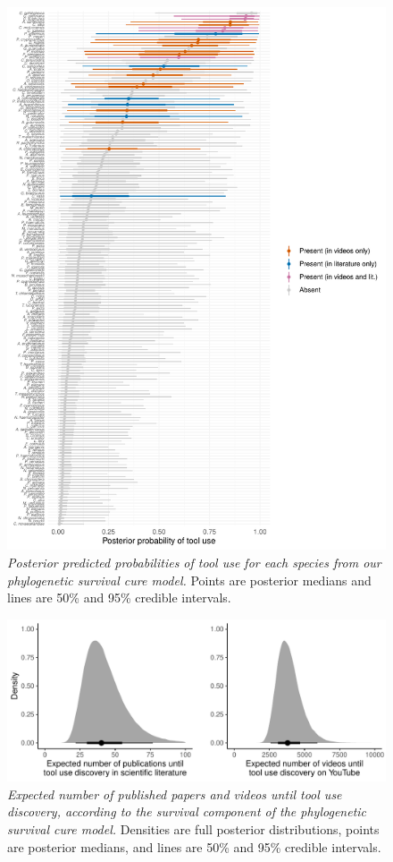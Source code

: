 \documentclass[
  man,floatsintext]{apa6}
\begin{document}
\begin{figure}
\centering
\includegraphics{manuscript_files/figure-latex/plotSurvCure1-1.pdf}
\caption{\label{fig:plotSurvCure1}\emph{Posterior predicted probabilities of tool use for each species from our phylogenetic survival cure model.} Points are posterior medians and lines are 50\% and 95\% credible intervals.}
\end{figure}



\begin{figure}
\centering
\includegraphics{manuscript_files/figure-latex/plotSurvCure2-1.pdf}
\caption{\label{fig:plotSurvCure2}\emph{Expected number of published papers and videos until tool use discovery, according to the survival component of the phylogenetic survival cure model.} Densities are full posterior distributions, points are posterior medians, and lines are 50\% and 95\% credible intervals.}
\end{figure}
\end{document}

